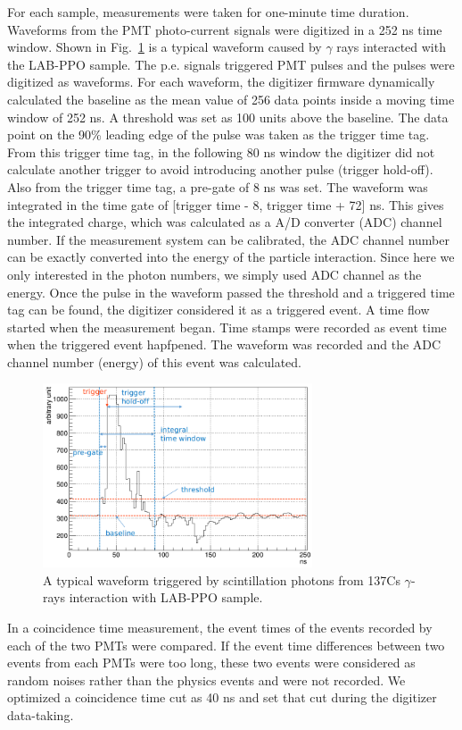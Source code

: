 For each sample, measurements were taken for one-minute time duration. Waveforms from the PMT photo-current signals were digitized in a 252 ns time window. Shown in Fig.~\ref{teLSwaveform} is a typical waveform caused by $\gamma$ rays interacted with the LAB-PPO sample. The p.e. signals triggered PMT pulses and the pulses were digitized as waveforms. For each waveform, the digitizer firmware dynamically calculated the baseline as the mean value of 256 data points inside a moving time window of 252 ns. A threshold was set as 100 units above the baseline. The data point on the 90\% leading edge of the pulse was taken as the trigger time tag. From this trigger time tag, in the following 80 ns window the digitizer did not calculate another trigger to avoid introducing another pulse (trigger hold-off). Also from the trigger time tag, a pre-gate of 8 ns was set. The waveform was integrated in the time gate of  [trigger time - 8,  trigger time + 72] ns. This gives the integrated charge, which was calculated as a A/D converter (ADC) channel number. If the measurement system can be calibrated, the ADC channel number can be exactly converted into the energy of the particle interaction. Since here we only interested in the photon numbers, we simply used ADC channel as the energy. Once the pulse in the waveform passed the threshold and a triggered time tag can be found, the digitizer considered it as a triggered event. A time flow started when the measurement began. Time stamps were recorded as event time when the triggered event hapfpened. The waveform was recorded and the ADC channel number (energy) of this event was calculated.

\begin{figure}[htbp]
	\centering	
	\includegraphics[width=8cm]{teLS_waveform.png}
	\caption{A typical waveform triggered by scintillation photons from 137Cs $\gamma$-rays interaction with LAB-PPO sample.}
	\label{teLSwaveform}
\end{figure}

In a coincidence time measurement, the event times of the events recorded by each of the two PMTs were compared. If the event time differences between two events from each PMTs were too long, these two events were considered as random noises rather than the physics events and were not recorded. We optimized a coincidence time cut as 40 ns and set that cut during the digitizer data-taking. 


